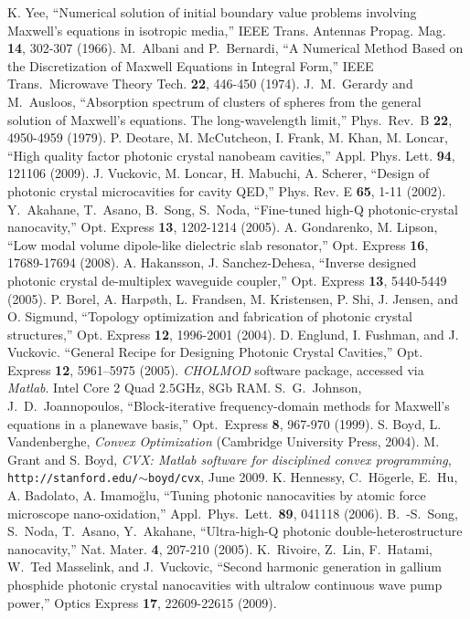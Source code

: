 \documentclass[10pt,letterpaper]{article}
\begin{document}
\begin{thebibliography}{99}
 K. Yee, ``Numerical solution of initial boundary value problems involving Maxwell’s equations in isotropic media,'' IEEE Trans. Antennas Propag. Mag. \textbf{14}, 302-307 (1966).
 M.~Albani and P.~Bernardi, ``A Numerical Method Based on the Discretization of Maxwell Equations in Integral Form,'' IEEE Trans.~Microwave Theory Tech. \textbf{22}, 446-450 (1974).
 J.~M.~Gerardy and M.~Ausloos, ``Absorption spectrum of clusters of spheres from the general solution of Maxwell's equations. The long-wavelength limit,'' Phys.~Rev.~B \textbf{22}, 4950-4959 (1979).
 P. Deotare, M. McCutcheon, I. Frank, M. Khan, M. Loncar, ``High quality factor photonic crystal nanobeam cavities,'' Appl. Phys. Lett. \textbf{94}, 121106 (2009).
 J. Vuckovic, M. Loncar, H. Mabuchi, A. Scherer, ``Design of photonic crystal microcavities for cavity QED,'' Phys. Rev. E \textbf{65}, 1-11 (2002).
 Y.~Akahane, T.~Asano, B.~Song, S.~Noda, ``Fine-tuned high-Q photonic-crystal nanocavity,'' Opt. Express \textbf{13}, 1202-1214 (2005).
 A. Gondarenko, M. Lipson, ``Low modal volume dipole-like dielectric slab resonator,'' Opt. Express \textbf{16}, 17689-17694 (2008).
 A. Hakansson, J. Sanchez-Dehesa, ``Inverse designed photonic crystal de-multiplex waveguide coupler,'' Opt. Express \textbf{13}, 5440-5449 (2005).
 P. Borel, A. Harpøth, L. Frandsen, M. Kristensen, P. Shi, J. Jensen, and O. Sigmund, ``Topology optimization and fabrication of photonic crystal structures,'' Opt. Express \textbf{12}, 1996-2001 (2004).
 D. Englund, I. Fushman, and J. Vuckovic. ``General Recipe for Designing Photonic Crystal Cavities,'' Opt. Express \textbf{12}, 5961–5975 (2005).
 \emph{CHOLMOD} software package, accessed via \emph{Matlab}.
 Intel Core 2 Quad $2.5$GHz, 8Gb RAM.
 S.~G.~Johnson, J.~D.~Joannopoulos, ``Block-iterative frequency-domain methods for Maxwell’s equations in a planewave basis,'' Opt.~Express \textbf{8}, 967-970 (1999).
 S. Boyd, L. Vandenberghe, \emph{Convex Optimization} (Cambridge University Press, 2004).
 M. Grant and S. Boyd, \emph{CVX: Matlab software for disciplined convex programming}, \texttt{http://stanford.edu/$\sim$boyd/cvx}, June 2009.
 K. Hennessy, C.~Högerle, E.~Hu, A. Badolato, A. Imamoğlu, ``Tuning photonic nanocavities by atomic force microscope nano-oxidation,'' Appl.~Phys.~Lett.~\textbf{89}, 041118 (2006).
 B.~-S.~Song, S.~Noda, T.~Asano, Y.~Akahane, ``Ultra-high-Q photonic double-heterostructure nanocavity,'' Nat. Mater. \textbf{4}, 207-210 (2005).
 K.~Rivoire, Z.~Lin, F.~Hatami, W.~Ted Masselink, and J.~Vuckovic, ``Second harmonic generation in gallium phosphide photonic crystal nanocavities with ultralow continuous wave pump power,'' Optics Express \textbf{17}, 22609-22615 (2009).
\end{thebibliography}
\end{document}
